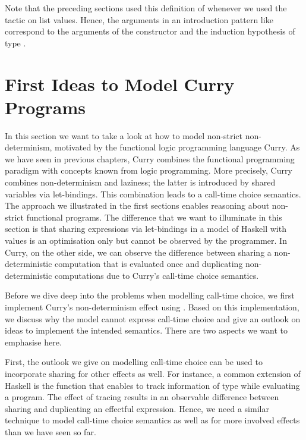 Note that the preceding sections used this definition of  whenever we used the tactic  on list
values.
Hence, the arguments in an introduction pattern like \cinl{[ | fy fys IH ]} correspond to the arguments of the  constructor and the induction hypothesis of type .

\section{First Ideas to Model Curry Programs}

In this section we want to take a look at how to model non\--strict non\--determinism, motivated by the functional logic programming language Curry.
As we have seen in previous chapters, Curry combines the functional programming paradigm with concepts known from logic programming.
More precisely, Curry combines non\--determinism and laziness; the latter is introduced by shared variables via let\--bindings.
This combination leads to a call\--time choice semantics.
The approach we illustrated in the first sections enables reasoning about non\--strict functional programs.
The difference that we want to illuminate in this section is that sharing expressions via let\--bindings in a model of Haskell with  values is an optimisation only but cannot be observed by the programmer.
In Curry, on the other side, we can observe the difference between sharing a non\--deterministic computation that is evaluated once and duplicating non\--deterministic computations due to Curry's call\--time choice semantics.

Before we dive deep into the problems when modelling call\--time choice, we first implement Curry's non\--determinism effect using .
Based on this implementation, we discuss why the model cannot express call\--time choice and give an outlook on ideas to implement the intended semantics.
There are two aspects we want to emphasise here.

First, the outlook we give on modelling call\--time choice can be used to incorporate sharing for other effects as well.
For instance, a common extension of Haskell is the function  that enables to track information of type  while evaluating a program.
The effect of tracing results in an observable difference between sharing and duplicating an effectful expression.
Hence, we need a similar technique to model call\--time choice semantics as well as for more involved effects than we have seen so far.


